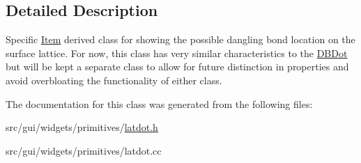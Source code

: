 \subsection{Detailed Description}
Specific \hyperlink{classprim_1_1Item}{Item} derived class for showing the possible dangling bond location on the surface lattice. For now, this class has very similar characteristics to the \hyperlink{classprim_1_1DBDot}{D\+B\+Dot} but will be kept a separate class to allow for future distinction in properties and avoid overbloating the functionality of either class. 

The documentation for this class was generated from the following files\+:\begin{DoxyCompactItemize}
\item 
src/gui/widgets/primitives/\hyperlink{latdot_8h}{latdot.\+h}\item 
src/gui/widgets/primitives/latdot.\+cc\end{DoxyCompactItemize}
